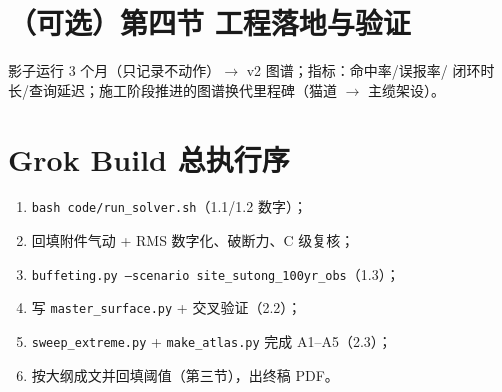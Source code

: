 \documentclass[11pt,a4paper]{ctexart}
\begin{document}
\section*{（可选）第四节 工程落地与验证}

影子运行 3 个月（只记录不动作）$\to$ v2 图谱；指标：命中率/误报率/
闭环时长/查询延迟；施工阶段推进的图谱换代里程碑（猫道 $\to$ 主缆架设）。

\section*{Grok Build 总执行序}

\begin{enumerate}
  \item \texttt{bash code/run\_solver.sh}（1.1/1.2 数字）；
  \item 回填附件气动 + RMS 数字化、破断力、C 级复核；
  \item \texttt{buffeting.py --scenario site\_sutong\_100yr\_obs}（1.3）；
  \item 写 \texttt{master\_surface.py} + 交叉验证（2.2）；
  \item \texttt{sweep\_extreme.py} + \texttt{make\_atlas.py} 完成 A1--A5（2.3）；
  \item 按大纲成文并回填阈值（第三节），出终稿 PDF。
\end{enumerate}
\end{document}

